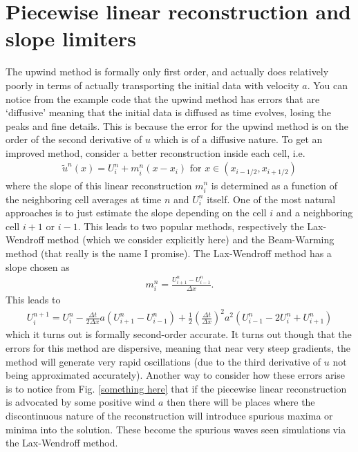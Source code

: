 \section*{Piecewise linear reconstruction and slope limiters}
The upwind method is formally only first order, and actually does relatively poorly in terms of actually transporting the initial data with velocity $a$.  You can notice from the example code that the upwind method has errors that are `diffusive' meaning that the initial data is diffused as time evolves, losing the peaks and fine details.  This is because the error for the upwind method is on the order of the second derivative of $u$ which is of a diffusive nature.  To get an improved method, consider a better reconstruction inside each cell, i.e.
\begin{gather}
\tilde{u}^n(x) = U_i^n + m_i^n(x-x_i) \mbox{ for } x \in (x_{i-1/2},x_{i+1/2})
\end{gather}
where the slope of this linear reconstruction $m_i^n$ is determined as a function of the neighboring cell averages at time $n$ and $U_i^n$ itself.  One of the most natural approaches is to just estimate the slope depending on the cell $i$ and a neighboring cell $i+1$ or $i-1$.  This leads to two popular methods, respectively the Lax-Wendroff method (which we consider explicitly here) and the Beam-Warming method (that really is the name I promise).  The Lax-Wendroff method has a slope chosen as
\begin{gather}
m_i^n = \frac{U^n_{i+1}-U_{i-1}^n}{\Delta x}.
\end{gather}
This leads to
\begin{gather}
U_i^{n+1} = U_i^n - \frac{\Delta t}{2\Delta x} a \left(U_{i+1}^n-U_{i-1}^n\right) + \frac{1}{2}\left(\frac{\Delta t}{\Delta x}\right)^2 a^2 \left(U_{i-1}^n - 2U_i^n+U_{i+1}^n\right)
\end{gather}
which it turns out is formally second-order accurate.  It turns out though that the errors for this method are dispersive, meaning that near very steep gradients, the method will generate very rapid oscillations (due to the third derivative of $u$ not being approximated accurately).  Another way to consider how these errors arise is to notice from Fig. \ref{something here} that if the piecewise linear reconstruction is advocated by some positive wind $a$ then there will be places where the discontinuous nature of the reconstruction will introduce spurious maxima or minima into the solution.  These become the spurious waves seen simulations via the Lax-Wendroff method.

